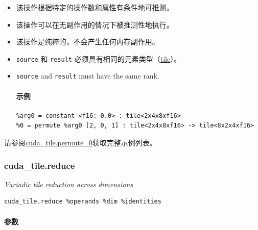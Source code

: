 \documentclass{article}
\begin{document}
\begin{itemize}
\item 该操作根据特定的操作数和属性有条件地可推测。
\item 该操作可以在无副作用的情况下被推测性地执行。
\item 该操作是纯粹的，不会产生任何内存副作用。
\item \texttt{source} 和 \texttt{result} 必须具有相同的元素类型（\href{https://docs.nvidia.com/cuda/tile-ir/latest/sections/types.html#type-tile}{tile}）。
\item \texttt{source} and \texttt{result} must have the same rank.


\paragraph{示例}

\begin{lstlisting}
%arg0 = constant <f16: 0.0> : tile<2x4x8xf16>
%0 = permute %arg0 [2, 0, 1] : tile<2x4x8xf16> -> tile<8x2x4xf16>
\end{lstlisting}

\end{itemize}
请参阅\href{https://docs.nvidia.com/cuda/tile-ir/latest/sections/appendix.html#example-cuda-tile-permute-0}{cuda\_tile.permute\_0}获取完整示例列表。



\subsubsection{cuda\_tile.reduce}

\textit{Variadic tile reduction across dimensions}


\begin{lstlisting}
cuda_tile.reduce %operands %dim %identities
\end{lstlisting}

\paragraph{参数}
\end{document}

